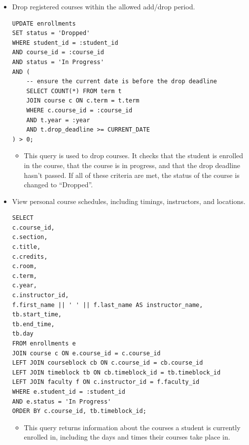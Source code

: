 \documentclass{report}
\begin{document}
\begin{itemize}
    \item Drop registered courses within the allowed add/drop period.
    \begin{lstlisting}
UPDATE enrollments
SET status = 'Dropped'
WHERE student_id = :student_id
AND course_id = :course_id
AND status = 'In Progress'
AND (
    -- ensure the current date is before the drop deadline
    SELECT COUNT(*) FROM term t
    JOIN course c ON c.term = t.term
    WHERE c.course_id = :course_id
    AND t.year = :year
    AND t.drop_deadline >= CURRENT_DATE
) > 0;
    \end{lstlisting}
    \begin{itemize}
        \item This query is used to drop courses. It checks that the student is enrolled in the course, that the course is in progress, and that the drop deadline hasn't passed. If all of these criteria are met, the status of the course is changed to ``Dropped''.
    \end{itemize}

    \item View personal course schedules, including timings, instructors, and locations.
    \begin{lstlisting}
SELECT
c.course_id,
c.section,
c.title,
c.credits,
c.room,
c.term,
c.year,
c.instructor_id,
f.first_name || ' ' || f.last_name AS instructor_name,
tb.start_time,
tb.end_time,
tb.day
FROM enrollments e
JOIN course c ON e.course_id = c.course_id
LEFT JOIN courseblock cb ON c.course_id = cb.course_id
LEFT JOIN timeblock tb ON cb.timeblock_id = tb.timeblock_id
LEFT JOIN faculty f ON c.instructor_id = f.faculty_id
WHERE e.student_id = :student_id
AND e.status = 'In Progress'
ORDER BY c.course_id, tb.timeblock_id;
    \end{lstlisting}
    \begin{itemize}
        \item This query returns information about the courses a student is currently enrolled in, including the days and times their courses take place in.
    \end{itemize}

    \pagebreak
    

\end{itemize}
\end{document}
